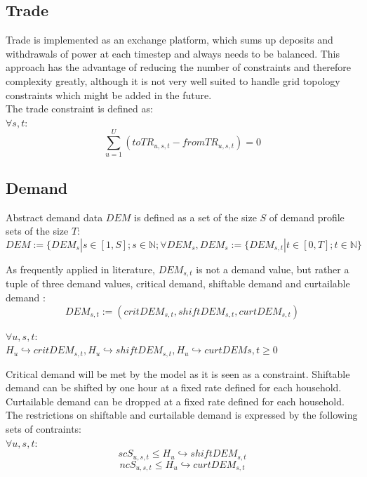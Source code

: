 \documentclass[
	11pt,								%
	DIV10,								%
	a4paper,         					%
	oneside,							%
	headheight=20pt,					%
	footheight=20pt,					%
    parskip=full,						%
    listof=totoc,						%
	bibliography=totoc,					%
	index=totoc,						%
]{scrartcl}
\begin{document}
\subsection{Trade}
Trade is implemented as an exchange platform, which sums up deposits and withdrawals of power at each timestep and always needs to be balanced. This approach has the advantage of reducing the number of constraints and therefore complexity greatly, although it is not very well suited to handle grid topology constraints which might be added in the future.\\
The trade constraint is defined as:
\\

$\forall s,t$:
\begin{equation}
	\sum_{u = 1}^{U}(toTR_{u,s,t}-fromTR_{u,s,t}) = 0
\end{equation}





\subsection{Demand}
Abstract demand data $DEM$ is defined as a set of the size $S$ of demand profile sets of the size $T$:
\begin{equation}
 DEM:= \{DEM_s | s \in [1,S]; s\in \mathbb{N}; \forall DEM_s, DEM_s := \{DEM_{s,t} | t\in [0,T]; t \in \mathbb{N}\}
\end{equation}

As frequently applied in literature, $DEM_{s,t}$ is not a demand value, but rather a tuple of three demand values, critical demand, shiftable demand and curtailable demand \cite{silvente2015rolling}\cite{zhang2015optimal}\cite{8216436}\cite{7972908} : \\
\begin{equation}
 DEM_{s,t}:= (critDEM_{s,t}, shiftDEM_{s,t}, curtDEM_{s,t}) 
\end{equation}

$\forall u,s,t$:\\
$H_u \hookrightarrow critDEM_{s,t}, H_u \hookrightarrow shiftDEM_{s,t}, H_u \hookrightarrow curtDEM{s,t} \geq 0$

Critical demand will be met by the model as it is seen as a constraint. Shiftable demand can be shifted by one hour at a fixed rate defined for each household. Curtailable demand can be dropped at a fixed rate defined for each household.
The restrictions on shiftable and curtailable demand is expressed by the following sets of contraints:
\\
$\forall u,s,t$:
\begin{equation}
	scS_{u,s,t} \leq H_u \hookrightarrow shiftDEM_{s,t}
\end{equation}
\begin{equation}
	ncS_{u,s,t} \leq H_u \hookrightarrow curtDEM_{s,t}
\end{equation}
\end{document}
